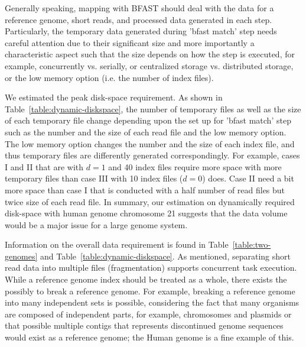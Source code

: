 \documentclass{sig-alternate}
\begin{document}

Generally speaking, mapping with BFAST should deal with the data for a
reference genome, short reads, and processed data generated in each
step.  Particularly, the temporary data generated during 'bfast match'
step needs careful attention due to their significant size and more
importantly a characteristic aspect such that the size depends on how
the step is executed, for example, concurrently vs. serially, or
centralized storage vs. distributed storage, or the low memory option
(i.e. the number of index files).

We estimated the peak disk-space requirement.  As shown
in Table~\ref{table:dynamic-diskspace}, the number of temporary files as
well as the size of each temporary file change depending upon the set
up for 'bfast match' step such as the number and the size of each read
file and the low memory option.  The low memory option changes the number and the size
of each index file, and thus temporary files are differently generated correspondingly.  For example, cases I and II that
are with $d=1$ and 40 index files require more space with more
temporary files than case III with 10 index files ($d=0$) does. Case
II need a bit more space than case I that is conducted with a half
number of read files but twice size of each read file.  In summary, our estimation on dynamically required disk-space with human
genome chromosome 21 suggests that the data volume would be a major
issue for a large genome system.
   


Information on the overall data requirement is found in
Table~\ref{table:two-genomes} and
Table~\ref{table:dynamic-diskspace}. As mentioned, separating short
read data into multiple files (fragmentation) supports concurrent task
execution.  While a reference genome index should be treated as a
whole, there exists the possibly to break a reference genome.  For
example, breaking a reference genome into many independent sets is
possible, considering the fact that many organisms are composed of
independent parts, for example, chromosomes and plasmids or that
possible multiple contigs that represents discontinued genome
sequences would exist as a reference genome; the Human genome is a
fine example of this.
\end{document}
